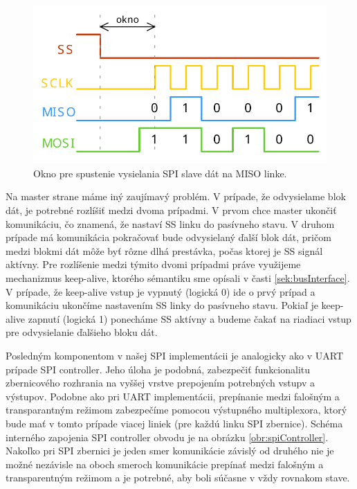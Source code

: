 \begin{figure}
    \centerline{\includegraphics[width=1\textwidth]{images/signals/spiSlaveWindow.pdf}}
    \caption[Okno pre spustenie vysielania SPI slave dát]{Okno pre spustenie vysielania SPI slave dát na MISO linke.}
    \label{obr:spiSlaveWindow}
\end{figure}

Na master strane máme iný zaujímavý problém. V prípade, že odvysielame blok dát, je potrebné rozlíšiť medzi dvoma prípadmi. V prvom chce master ukončiť komunikáciu, čo znamená, že nastaví SS linku do pasívneho stavu. V druhom prípade má komunikácia pokračovať bude odvysielaný ďalší blok dát, pričom medzi blokmi dát môže byť rôzne dlhá prestávka, počas ktorej je SS signál aktívny. Pre rozlíšenie medzi týmito dvomi prípadmi práve využijeme mechanizmus keep-alive, ktorého sémantiku sme opísali v časti \ref{sek:busInterface}. V prípade, že keep-alive vstup je vypnutý (logická 0) ide o prvý prípad a komunikáciu ukončíme nastavením SS linky do pasívneho stavu. Pokiaľ je  keep-alive zapnutí (logická 1) ponecháme SS aktívny a budeme čakať na riadiaci vstup pre odvysielanie ďalšieho bloku dát.

Posledným komponentom v našej SPI implementácii je analogicky ako v UART prípade SPI controller. Jeho úloha je podobná, zabezpečiť funkcionalitu zbernicového rozhrania na vyššej vrstve prepojením potrebných vstupv a výstupov. Podobne ako pri UART implementácii, prepínanie medzi falošným a transparantným režimom zabezpečíme pomocou výstupného multiplexora, ktorý bude mať v tomto prípade viacej liniek (pre každú linku SPI zbernice). Schéma interného zapojenia SPI controller obvodu je na obrázku \ref{obr:spiController}. Nakoľko pri SPI zbernici je jeden smer komunikácie závislý od druhého nie je možné nezávisle na oboch smeroch komunikácie prepínať medzi falošným a transparentným režimom a je potrebné, aby boli súčasne v vždy rovnakom stave.

